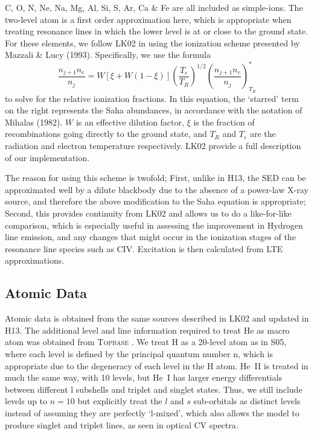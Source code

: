 \documentclass[preprint, a4paper, 11pt]{aastex}
\begin{document}
C, O, N, Ne, Na, Mg, Al, Si, S, Ar, Ca \& Fe are all included as simple-ions. 
The two-level atom is a first order approximation here, which is appropriate 
when treating resonance lines in which the lower level is at or close to the 
ground state. 
For these elements, we follow LK02 in using the ionization scheme presented by Mazzali \& Lucy (1993). 
Specifically, we use the formula
\begin{equation}
\frac{n_{j+1} n_e}{n_j} = W [\xi + W(1-\xi)]
\left(\frac{T_e}{T_R}\right)^{1/2}
\left(\frac{n_{j+1}n_e}{n_j}\right)^*_{T_R} \label{ionization}
\end{equation}
to solve for the relative ionization fractions. In this equation, the `starred' term on 
the right represents the Saha abundances, in accordance with the notation of Mihalas (1982). 
$W$ is an effective dilution factor, $\xi$ is the
fraction of recombinations going directly to the ground state, and
$T_R$ and $T_e$ are the radiation and electron temperature
respectively. LK02 provide a full description of our implementation.

The reason for using this scheme 
is twofold; First, unlike in H13, the SED can be approximated well by a dilute blackbody due to the 
absence of a power-law X-ray source, and therefore the above modification to the Saha equation
is appropriate; Second, this provides continuity from LK02 and allows us to do a like-for-like comparison,
which is especially useful in assessing the improvement in Hydrogen line emission, and any changes
that might occur in the ionization stages of the resonance line species such as CIV. 
Excitation is then calculated from LTE approximations. 



\subsection{Atomic Data}
Atomic data is obtained from the same sources described in LK02 and updated in H13. 
The additional level and line information required to treat He as macro atom was 
obtained from \textsc{Topbase} \citep{topbase2005}. We treat H as a 20-level atom as in S05, where 
each level is defined by the principal quantum number n, which is appropriate due to
the degeneracy of each level in the H atom. He~\textsc{II} is treated in much the same way,
with 10 levels, but He~\textsc{I} has larger energy differentials between different l subshells
and triplet and singlet states. Thus, we still include levels up to $n=10$ but explicitly 
treat the $l$ and $s$ sub-orbitals as distinct levels instead of assuming they are perfectly `l-mixed',
which also allows the model to produce singlet and 
triplet lines, as seen in optical CV spectra.
\end{document}
